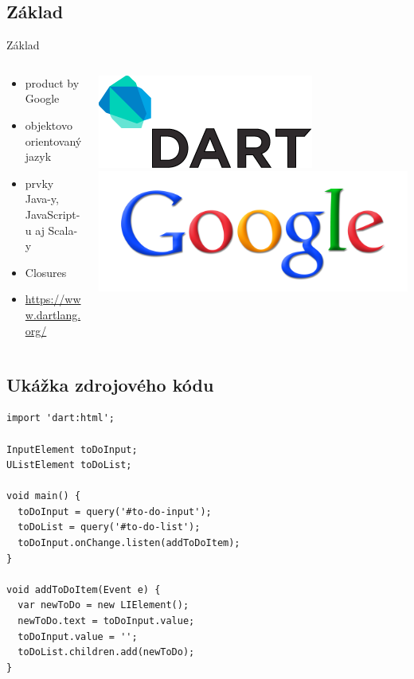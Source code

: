 \subsection{Základ}
\begin{frame}{Základ}
	\begin{columns}[T]
		\begin{column}{.5\textwidth}
			\begin{itemize}
				\item product by Google
				\item objektovo orientovaný jazyk
				\item prvky Java-y, JavaScript-u aj Scala-y
				\item Closures
				\item \url{https://www.dartlang.org/}
			\end{itemize}
		\end{column}
		\begin{column}{.5\textwidth}
			\includegraphics[scale=0.3]{images/dart-logo.png}\\
			\includegraphics[scale=0.05]{images/google.png}
		\end{column}
	\end{columns}
\end{frame}

\subsection{Ukážka zdrojového kódu}
\begin{frame}[fragile]
	\begin{verbatim}
import 'dart:html';

InputElement toDoInput;
UListElement toDoList;

void main() {
  toDoInput = query('#to-do-input');
  toDoList = query('#to-do-list');
  toDoInput.onChange.listen(addToDoItem);
}

void addToDoItem(Event e) {
  var newToDo = new LIElement();
  newToDo.text = toDoInput.value;
  toDoInput.value = '';
  toDoList.children.add(newToDo);
}
	\end{verbatim}
\end{frame}

